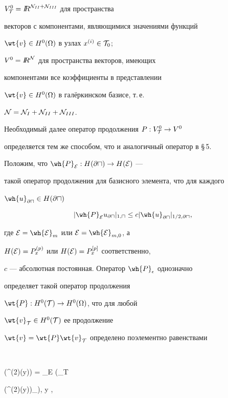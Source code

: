 $V^0_{\cal T} = {I\!\!R}^{{\cal N}_{II}+{\cal N}_{III}}$ для пространства


векторов с компонентами, являющимися значениями функций 


$\wt{v}\in H^0(\Omega)$ в узлах $x^{(i)}\in{\cal T}_0$;





$V^0={I\!\!R}^{{\cal N}}$ для пространства векторов, имеющих 


компонентами все коэффициенты в представлении 


$\wt{v}\in H^0(\Omega)$ в гал\"еркинском базисе, т.\,е.


${{\cal N}} = {{\cal N}}_I + {{\cal N}}_{II} + {{\cal N}}_{III}$. 





Необходимый далее оператор продолжения $P:V^0_{{\cal T}} \to V^0$ 


определяется тем же способом, что и аналогичный оператор в \S\,5.


Положим, что $\wh{P}_{{\cal E}}: H(\partial\sqcap) \to H({\cal E})$ ---


такой оператор продолжения для базисного элемента, что для каждого 


$\wh{u}_{\partial\sqcap} \in H(\partial\sqcap)$


$$


|\wh{P}_{{\cal E}} u_{\partial\sqcap}|_{1,\sqcap} \leq


c|\wh{u}_{\partial\sqcap}|_{1/2,\partial\sqcap},


$$


где ${\cal E}=\wh{{\cal E}}_m$ или ${\cal E}=\wh{{\cal E}}_{m,0}$, а 


$H({\cal E}) = P^{(p)}_x$ или $H({\cal E}) = P^{[p]}_x$ соответственно,


$c$ --- абсолютная постоянная. Оператор $\wh{P}_\epsilon$ однозначно


определяет такой оператор продолжения 


$\wt{P}:H^0({\cal T}) \to H^0(\Omega)$, что для любой 


$\wt{v}_{\cal T} \in H^0({\cal T})$ ее продолжение 


$\wt{v}=\wt{P}\wt{v}_{\cal T}$ определено поэлементно равенствами


$$


(^{(2)}(y)) = _{{\cal E}} (_{\cal T}


(^{(2)}(y))\mid_{\partial\sqcap}), \quad y \in \ov{\sqcap}, \quad


